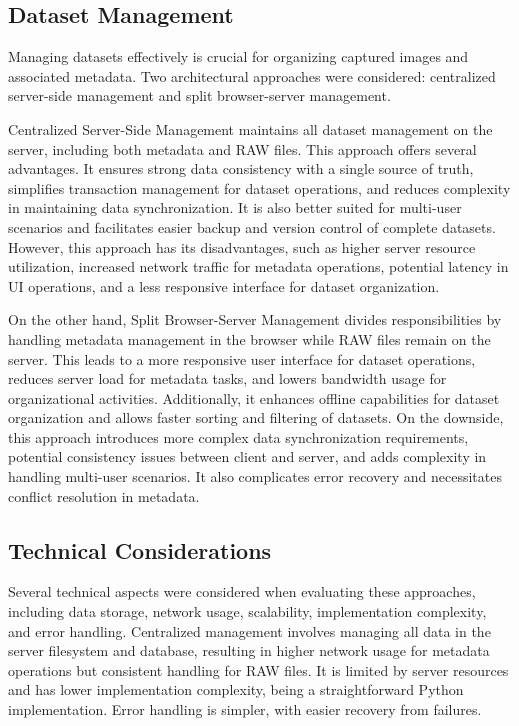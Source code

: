 \subsection{Dataset Management}

Managing datasets effectively is crucial for organizing captured images and associated metadata. Two architectural approaches were considered: centralized server-side management and split browser-server management.

Centralized Server-Side Management maintains all dataset management on the server, including both metadata and RAW files. This approach offers several advantages. It ensures strong data consistency with a single source of truth, simplifies transaction management for dataset operations, and reduces complexity in maintaining data synchronization. It is also better suited for multi-user scenarios and facilitates easier backup and version control of complete datasets. However, this approach has its disadvantages, such as higher server resource utilization, increased network traffic for metadata operations, potential latency in UI operations, and a less responsive interface for dataset organization.

On the other hand, Split Browser-Server Management divides responsibilities by handling metadata management in the browser while RAW files remain on the server. This leads to a more responsive user interface for dataset operations, reduces server load for metadata tasks, and lowers bandwidth usage for organizational activities. Additionally, it enhances offline capabilities for dataset organization and allows faster sorting and filtering of datasets. On the downside, this approach introduces more complex data synchronization requirements, potential consistency issues between client and server, and adds complexity in handling multi-user scenarios. It also complicates error recovery and necessitates conflict resolution in metadata.

\subsection{Technical Considerations}

Several technical aspects were considered when evaluating these approaches, including data storage, network usage, scalability, implementation complexity, and error handling. Centralized management involves managing all data in the server filesystem and database, resulting in higher network usage for metadata operations but consistent handling for RAW files. It is limited by server resources and has lower implementation complexity, being a straightforward Python implementation. Error handling is simpler, with easier recovery from failures.

